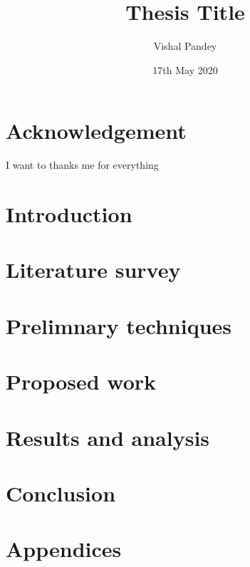\documentclass[12pt]{report}
\title{Thesis Title}
\author{Vishal Pandey}
\date{17th May 2020}
\begin{document}









\chapter*{Acknowledgement}
I want to thanks me for everything


\tableofcontents

\chapter{Introduction}


\chapter{Literature survey}


\chapter{Prelimnary techniques}


\chapter{Proposed work}


\chapter{Results and analysis}


\chapter{Conclusion}



\appendix
\chapter{Appendices}

\end{document}
